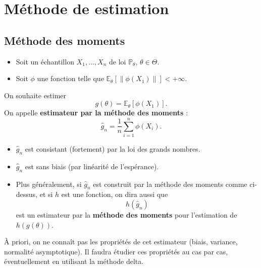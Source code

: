 \chapter{Méthode de estimation}

\section{Méthode des moments}

\smallskip

\begin{mdframed}
\begin{definition}

\begin{itemize}
    \item Soit un échantillon $X_1, \ldots, X_n$ de loi $\mathbb{P}_\theta$, $\theta \in \Theta$.
    \item Soit $\phi$ une fonction telle que $\mathbb{E}_\theta\left[\|\phi(X_1)\|\right] < +\infty$.
\end{itemize}
On souhaite estimer
\[
g(\theta) = \mathbb{E}_\theta[\phi(X_1)].
\]
On appelle \textbf{estimateur par la méthode des moments} :
\[
\hat{g}_n = \frac{1}{n} \sum_{i=1}^n \phi(X_i).
\]
\end{definition}
\end{mdframed}


\begin{notation}
\begin{itemize}
    \item $\hat{g}_n$ est consistant (fortement) par la loi des grands nombres.
    \item $\hat{g}_n$ est sans biais (par linéarité de l'espérance).
    \item Plus généralement, si $\hat{g}_n$ est construit par la méthode des moments comme ci-dessus, et si $h$ est une fonction, on dira aussi que
    \[
    h(\hat{g}_n)
    \]
    est un estimateur par la \textbf{méthode des moments} pour l'estimation de $h(g(\theta))$.
\end{itemize}
\end{notation}


\begin{remarque}
À priori, on ne connaît pas les propriétés de cet estimateur (biais, variance, normalité asymptotique). Il faudra étudier ces propriétés au cas par cas, éventuellement en utilisant la méthode delta.
\end{remarque}

